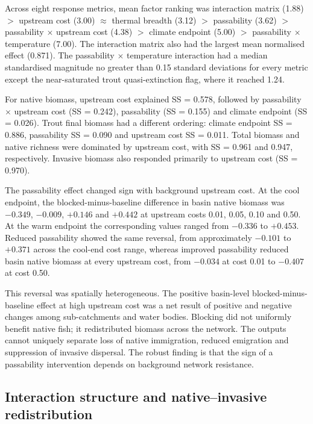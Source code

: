 \documentclass[11pt,a4paper]{article}
\begin{document}
Across eight response metrics, mean factor ranking was interaction matrix (1.88) $>$ upstream cost (3.00) $\approx$ thermal breadth (3.12) $>$ passability (3.62) $>$ passability $\times$ upstream cost (4.38) $>$ climate endpoint (5.00) $>$ passability $\times$ temperature (7.00). The interaction matrix also had the largest mean normalised effect (0.871). The passability $\times$ temperature interaction had a median standardised magnitude no greater than 0.15 standard deviations for every metric except the near-saturated trout quasi-extinction flag, where it reached 1.24.

For native biomass, upstream cost explained SS = 0.578, followed by passability $\times$ upstream cost (SS = 0.242), passability (SS = 0.155) and climate endpoint (SS = 0.026). Trout final biomass had a different ordering: climate endpoint SS = 0.886, passability SS = 0.090 and upstream cost SS = 0.011. Total biomass and native richness were dominated by upstream cost, with SS = 0.961 and 0.947, respectively. Invasive biomass also responded primarily to upstream cost (SS = 0.970).

The passability effect changed sign with background upstream cost. At the cool endpoint, the blocked-minus-baseline difference in basin native biomass was $-0.349$, $-0.009$, $+0.146$ and $+0.442$ at upstream costs 0.01, 0.05, 0.10 and 0.50. At the warm endpoint the corresponding values ranged from $-0.336$ to $+0.453$. Reduced passability showed the same reversal, from approximately $-0.101$ to $+0.371$ across the cool-end cost range, whereas improved passability reduced basin native biomass at every upstream cost, from $-0.034$ at cost 0.01 to $-0.407$ at cost 0.50.

This reversal was spatially heterogeneous. The positive basin-level blocked-minus-baseline effect at high upstream cost was a net result of positive and negative changes among sub-catchments and water bodies. Blocking did not uniformly benefit native fish; it redistributed biomass across the network. The outputs cannot uniquely separate loss of native immigration, reduced emigration and suppression of invasive dispersal. The robust finding is that the sign of a passability intervention depends on background network resistance.

\subsection{Interaction structure and native--invasive redistribution}
\end{document}
